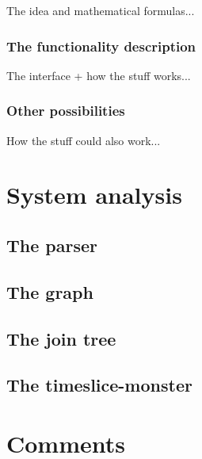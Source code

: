 \documentclass[12pt,a4paper]{report}
\begin{document}
The idea and mathematical formulas...

\subsection{The functionality description}

The interface + how the stuff works...

\subsection{Other possibilities}

How the stuff could also work...



\newpage
\chapter{System analysis}
\section{The parser}

\section{The graph}

\section{The join tree}

\section{The timeslice-monster}


\newpage
\chapter{Comments}


\newpage
%
\end{document}

